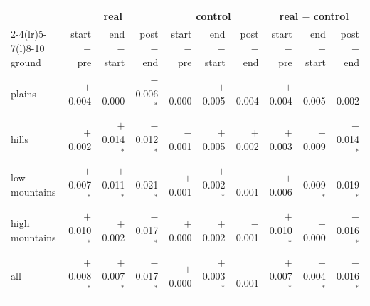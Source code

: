 \begin{tabular}{@{}l r r r r r r r r r@{}}
\toprule
 & \multicolumn{3}{c}{real} & \multicolumn{3}{c}{control} & \multicolumn{3}{c}{real $-$ control} \\
\cmidrule(lr){2-4}\cmidrule(lr){5-7}\cmidrule(l){8-10}
ground & start $-$ pre & end $-$ start & post $-$ end & start $-$ pre & end $-$ start & post $-$ end & start $-$ pre & end $-$ start & post $-$ end \\
\midrule
plains & $+$0.004 & $-$0.000 & $-$0.006$^\ast$ & $-$0.000 & $+$0.005 & $-$0.004 & $+$0.004 & $-$0.005 & $-$0.002 \\
hills & $+$0.002 & $+$0.014$^\ast$ & $-$0.012$^\ast$ & $-$0.001 & $+$0.005 & $+$0.002 & $+$0.003 & $+$0.009 & $-$0.014$^\ast$ \\
low mountains & $+$0.007$^\ast$ & $+$0.011$^\ast$ & $-$0.021$^\ast$ & $+$0.001 & $+$0.002$^\ast$ & $-$0.001 & $+$0.006 & $+$0.009$^\ast$ & $-$0.019$^\ast$ \\
high mountains & $+$0.010$^\ast$ & $+$0.002 & $-$0.017$^\ast$ & $+$0.000 & $+$0.002 & $-$0.001 & $+$0.010$^\ast$ & $-$0.000 & $-$0.016$^\ast$ \\
all & $+$0.008$^\ast$ & $+$0.007$^\ast$ & $-$0.017$^\ast$ & $+$0.000 & $+$0.003$^\ast$ & $-$0.001 & $+$0.007$^\ast$ & $+$0.004$^\ast$ & $-$0.016$^\ast$ \\
\bottomrule
\end{tabular}
